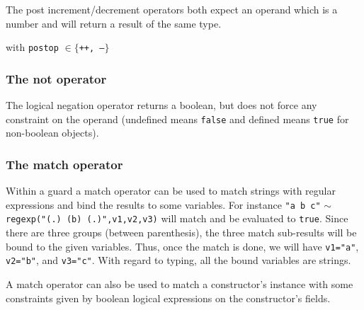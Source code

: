 \documentclass[11pt]{article}
\begin{document}
The post increment/decrement operators both expect an operand which is a number and will return a result of the same type.

\begin{center}
\DP
\end{center}
\begin{center}with  \texttt{postop} $\in \{$\texttt{++, --}$\}$\end{center}

\subsubsection{The not operator}

The logical negation operator returns a boolean, but does not force any constraint on the operand (undefined means \texttt{false} and defined means \texttt{true} for non-boolean objects).

\begin{center}
\DP
\end{center}

\subsubsection{The match operator}

Within a guard a match operator can be used to match strings with regular expressions and bind the results to some variables. For instance \texttt{"a b c"} $\sim$ \texttt{regexp("(.) (b) (.)",v1,v2,v3)} will match and be evaluated to \texttt{true}. Since there are three groups (between parenthesis), the three match sub-results will be bound to the given variables. Thus, once the match is done, we will have \texttt{v1="a"}, \texttt{v2="b"}, and \texttt{v3="c"}. With regard to typing, all the bound variables are strings.

\begin{center}
  
\DP
\end{center}

A match operator can also be used to match a constructor's instance with some constraints given by boolean logical expressions on the constructor's fields.
\end{document}
